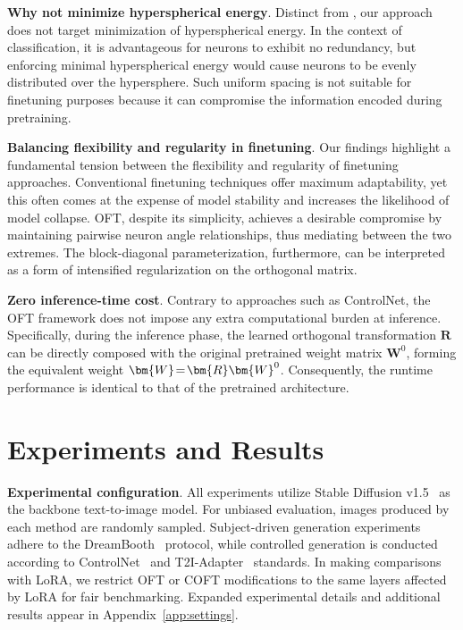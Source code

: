 \textbf{Why not minimize hyperspherical energy}. Distinct from \cite{liu2021orthogonal}, our approach does not target minimization of hyperspherical energy. In the context of classification, it is advantageous for neurons to exhibit no redundancy, but enforcing minimal hyperspherical energy would cause neurons to be evenly distributed over the hypersphere. Such uniform spacing is not suitable for finetuning purposes because it can compromise the information encoded during pretraining.

\textbf{Balancing flexibility and regularity in finetuning}. Our findings highlight a fundamental tension between the flexibility and regularity of finetuning approaches. Conventional finetuning techniques offer maximum adaptability, yet this often comes at the expense of model stability and increases the likelihood of model collapse. OFT, despite its simplicity, achieves a desirable compromise by maintaining pairwise neuron angle relationships, thus mediating between the two extremes. The block-diagonal parameterization, furthermore, can be interpreted as a form of intensified regularization on the orthogonal matrix.

\textbf{Zero inference-time cost}. Contrary to approaches such as ControlNet, the OFT framework does not impose any extra computational burden at inference. Specifically, during the inference phase, the learned orthogonal transformation $\bm{R}$ can be directly composed with the original pretrained weight matrix $\bm{W}^0$, forming the equivalent weight $\thickmuskip=2mu \medmuskip=2mu \bm{W}=\bm{R}\bm{W}^0$. Consequently, the runtime performance is identical to that of the pretrained architecture.

\section{Experiments and Results}

\textbf{Experimental configuration}. All experiments utilize Stable Diffusion v1.5~\cite{rombach2022high} as the backbone text-to-image model. For unbiased evaluation, images produced by each method are randomly sampled. Subject-driven generation experiments adhere to the DreamBooth~\cite{ruiz2023dreambooth} protocol, while controlled generation is conducted according to ControlNet~\cite{zhang2023adding} and T2I-Adapter~\cite{mou2023t2i} standards. In making comparisons with LoRA, we restrict OFT or COFT modifications to the same layers affected by LoRA for fair benchmarking. Expanded experimental details and additional results appear in Appendix~\ref{app:settings}.

